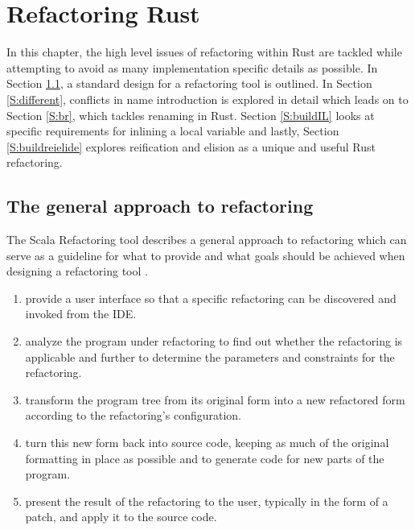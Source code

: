 \chapter{Refactoring Rust}\label{C:wd}
In this chapter, the high level issues of refactoring within Rust are tackled while attempting to avoid as many implementation specific details as possible. In Section \ref{S:generalapproach}, a standard design for a refactoring tool is outlined. In Section \ref{S:different}, conflicts in name introduction is explored in detail which leads on to Section \ref{S:br}, which tackles renaming in Rust. Section \ref{S:buildIL} looks at specific requirements for inlining a local variable and lastly, Section \ref{S:buildreielide} explores reification and elision as a unique and useful Rust refactoring.

\section{The general approach to refactoring}\label{S:generalapproach}
The Scala Refactoring tool describes a general approach to refactoring which can serve as a guideline for what to provide and what goals should be achieved when designing a refactoring tool \cite{stocker2010scala}.
\begin{enumerate}
\item provide a user interface so that a specific refactoring can be discovered and invoked from the IDE.
\item analyze the program under refactoring to find out whether the refactoring is applicable and further to determine the parameters and constraints for the refactoring.
\item transform the program tree from its original form into a new refactored form according to the refactoring’s configuration.
\item turn this new form back into source code, keeping as much of the original formatting in place as possible and to generate code for new parts of the program.
\item present the result of the refactoring to the user, typically in the form of a patch, and apply it to the source code.
\end{enumerate}

